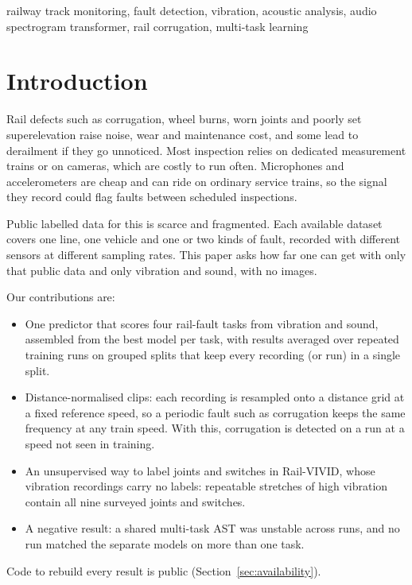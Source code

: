 \documentclass[conference]{IEEEtran}
\begin{document}
\begin{IEEEkeywords}
railway track monitoring, fault detection, vibration, acoustic analysis, audio spectrogram
transformer, rail corrugation, multi-task learning
\end{IEEEkeywords}

\section{Introduction}

Rail defects such as corrugation, wheel burns, worn joints and poorly set superelevation raise
noise, wear and maintenance cost, and some lead to derailment if they go unnoticed. Most
inspection relies on dedicated measurement trains or on cameras, which are costly to run often.
Microphones and accelerometers are cheap and can ride on ordinary service trains, so the signal
they record could flag faults between scheduled inspections.

Public labelled data for this is scarce and fragmented. Each available dataset covers one line,
one vehicle and one or two kinds of fault, recorded with different sensors at different
sampling rates. This paper asks how far one can get with only that public data and only
vibration and sound, with no images.

Our contributions are:
\begin{itemize}
  \item One predictor that scores four rail-fault tasks from vibration and sound, assembled from
        the best model per task, with results averaged over repeated training runs on grouped
        splits that keep every recording (or run) in a single split.
  \item Distance-normalised clips: each recording is resampled onto a distance grid at a fixed
        reference speed, so a periodic fault such as corrugation keeps the same frequency at any
        train speed. With this, corrugation is detected on a run at a speed not seen in
        training.
  \item An unsupervised way to label joints and switches in Rail-VIVID, whose vibration
        recordings carry no labels: repeatable stretches of high vibration contain all nine
        surveyed joints and switches.
  \item A negative result: a shared multi-task AST was unstable across runs, and no run matched
        the separate models on more than one task.
\end{itemize}
Code to rebuild every result is public (Section~\ref{sec:availability}).
\end{document}
